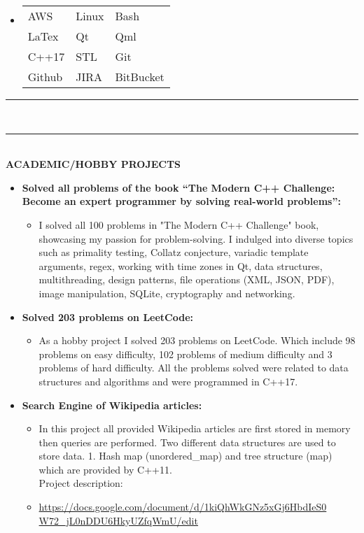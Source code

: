 \documentclass[9pt,a4paper]{article}
\newcommand{\MyHorizontalLine}{\noindent\rule{\linewidth}{1.5pt}\\}
\begin{document}
	\begin{itemize}
	\item[]
		\begin{tabularx}{1.25\linewidth}{XXX}
			AWS & Linux & Bash\\
			LaTex & Qt & Qml\\
			C++17 & STL & Git\\
			Github & JIRA & BitBucket
		\end{tabularx}
	\end{itemize}
	\MyHorizontalLine
	\newpage
	\MyHorizontalLine
	\textbf{ACADEMIC/HOBBY PROJECTS}
	\begin{itemize}
		\item \textbf{Solved all problems of the book “The Modern C++ Challenge: Become an expert programmer by solving real-world problems”:}
		\begin{itemize}
			\item[] I solved all 100 problems in "The Modern C++ Challenge" book, showcasing my passion for problem-solving. I indulged into diverse topics such as primality testing, Collatz conjecture, variadic template arguments, regex, working with time zones in Qt, data structures, multithreading, design patterns, file operations (XML, JSON, PDF), image manipulation, SQLite, cryptography and networking.
		\end{itemize}
		
			
		\item \textbf{Solved 203 problems on LeetCode:}
			\begin{itemize}
			\item[]As a hobby project I solved 203 problems on LeetCode. Which include 98 problems on easy difficulty, 102 problems of medium difficulty and 3 problems of hard difficulty. All the problems solved were related to data structures and algorithms and
			were programmed in C++17.
			\end{itemize}
		
		\item \textbf{Search Engine of Wikipedia articles:}
		\begin{itemize}
			\item[]In this project all provided Wikipedia articles are first stored in memory then queries are performed. Two different data structures are used to store data. 1. Hash map (unordered\_map) and tree structure (map) which are provided by C++11.\\
			Project description:
			\item[]\raggedright\href{https://docs.google.com/document/d/1kiQhWkGNz5xGj6HbdIeS0 W72_jL0nDDU6HkyUZfqWmU/edit}{https://docs.google.com/document/d/1kiQhWkGNz5xGj6HbdIeS0 W72\_jL0nDDU6HkyUZfqWmU/edit}
		\end{itemize}
		

\end{itemize}
\end{document}
